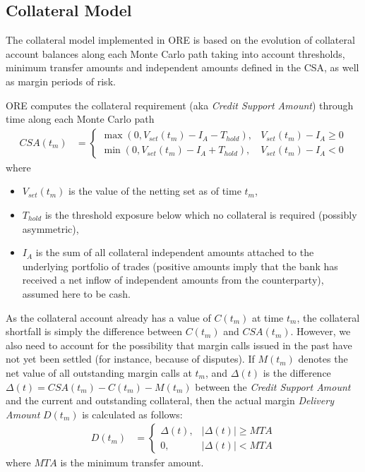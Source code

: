 \documentclass[12pt, a4paper]{article}
\begin{document}
{{\begin{appendix}
\subsection{Collateral Model}\label{sec:app_collateral}

The collateral model implemented in ORE is based on the evolution of collateral account balances along each Monte Carlo
path taking into account thresholds, minimum transfer amounts and independent amounts defined in the CSA, as well as
margin periods of risk.

ORE computes the collateral requirement (aka \emph{Credit Support Amount}) through time along each Monte Carlo path
\begin{align}\label{eq:CSA}
CSA(t_m) &= 
\begin{cases}
\max(0, V_{set}(t_m) - I_A - T_{hold}),& V_{set}(t_m) - I_A \ge 0 \\
\min(0, V_{set}(t_m) - I_A + T_{hold}),& V_{set}(t_m) - I_A < 0
\end{cases}
\end{align}
where
\begin{itemize}
\item $V_{set}(t_m)$ is the value of the netting set as of
  time $t_m$,
  \item $T_{hold}$ is the threshold exposure below which no collateral is
  required (possibly asymmetric),
\item $I_A$ is the sum of all collateral independent amounts attached to
  the underlying portfolio of trades (positive amounts imply that the bank
  has received a net inflow of independent amounts from the
  counterparty), assumed here to be cash.
\end{itemize}

As the collateral account already has a value of $C(t_m)$ at time $t_m$, the collateral shortfall is simply the
difference between $C(t_m)$ and $CSA(t_m)$. However, we also need to account for the possibility that margin calls
issued in the past have not yet been settled (for instance, because of disputes). If $M(t_m)$ denotes the net value of
all outstanding margin calls at $t_m$, and $\Delta(t)$ is the difference $\Delta(t) = CSA(t_m) - C(t_m) - M(t_m)$
between the {\em Credit Support Amount} and the current and outstanding collateral, then the actual margin
\emph{Delivery Amount} $D(t_m)$ is calculated as follows:
\begin{align}\label{eq:DA}
D(t_m) &= 
\begin{cases}
\Delta(t),& \left| \Delta(t) \right| \ge MTA \\
0,& \left| \Delta(t) \right| < MTA
\end{cases}
\end{align}
where $MTA$ is the minimum transfer amount.


\end{appendix}}}
\end{document}
